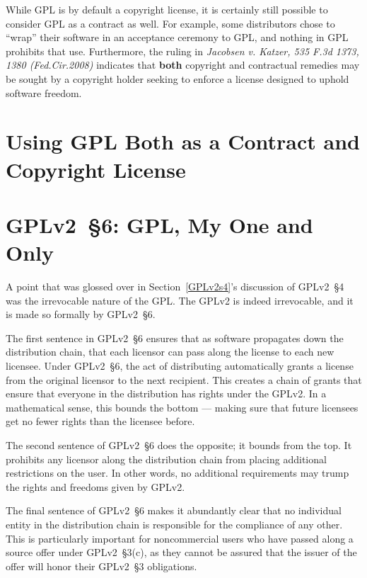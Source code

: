 While GPL is by default a copyright license, it is certainly still possible
to consider GPL as a contract as well.  For example, some distributors chose
to ``wrap'' their software in an acceptance ceremony to GPL, and nothing in
GPL prohibits that use.  Furthermore, the ruling in \textit{Jacobsen
  v. Katzer, 535 F.3d 1373, 1380 (Fed.Cir.2008)} indicates that \textbf{both}
copyright and contractual remedies may be sought by a copyright holder
seeking to enforce a license designed to uphold software freedom.

\section{Using GPL Both as a Contract and Copyright License}

\section{GPLv2~\S6: GPL, My One and Only}
\label{GPLv2s6}

A point that was glossed over in Section~\ref{GPLv2s4}'s discussion of GPLv2~\S4
was the irrevocable nature of the GPL\@. The GPLv2 is indeed irrevocable,
and it is made so formally by GPLv2~\S6.

The first sentence in GPLv2~\S6 ensures that as software propagates down the
distribution chain, that each licensor can pass along the license to each
new licensee.  Under GPLv2~\S6, the act of distributing automatically grants a
license from the original licensor to the next recipient.  This creates a
chain of grants that ensure that everyone in the distribution has rights
under the GPLv2\@.  In a mathematical sense, this bounds the bottom ---
making sure that future licensees get no fewer rights than the licensee before.

The second sentence of GPLv2~\S6 does the opposite; it bounds from the top.  It
prohibits any licensor along the distribution chain from placing
additional restrictions on the user.  In other words, no additional
requirements may trump the rights and freedoms given by GPLv2\@.

The final sentence of GPLv2~\S6 makes it abundantly clear that no individual
entity in the distribution chain is responsible for the compliance of any
other.  This is particularly important for noncommercial users who have
passed along a source offer under GPLv2~\S3(c), as they cannot be assured that
the issuer of the offer will honor their GPLv2~\S3 obligations.

